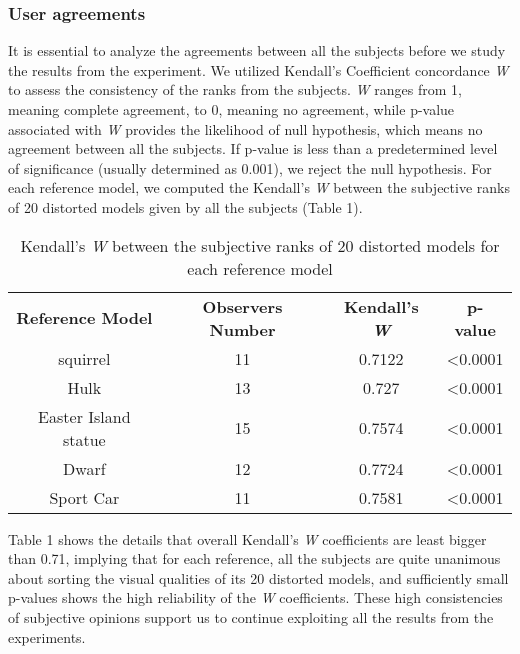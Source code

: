 \subsubsection{User agreements}
It is essential to analyze the agreements between all the subjects before we study the results from the experiment.  We utilized Kendall’s Coefficient concordance \textit{W} \cite{Kendall_1940} to assess the consistency of the ranks from the subjects.  \textit{W} ranges from 1, meaning complete agreement, to 0, meaning no agreement, while p-value associated with \textit{W} provides the likelihood of null hypothesis, which means no agreement between all the subjects. If p-value is less than a predetermined level of significance (usually determined as 0.001), we reject the null hypothesis. For each reference model, we computed the Kendall’s \textit{W} between the subjective ranks of 20 distorted models given by all the subjects (Table 1).\\
\begin{table} 
    \begin{tabular}{ c c c c }
        \textbf{Reference Model} & \textbf{Observers Number} & \textbf{Kendall's \textit{W}} & \textbf{p-value} \\ 
        squirrel & 11 & 0.7122 & <0.0001 \\ 
        Hulk & 13 & 0.727 & <0.0001 \\ 
        Easter Island statue & 15 & 0.7574 & <0.0001 \\ 
        Dwarf & 12 & 0.7724 & <0.0001 \\ 
        Sport Car & 11 & 0.7581 & <0.0001 \\ 
    \end{tabular} 
    \caption{Kendall’s \textit{W} between the subjective ranks of 20 distorted models for each reference model} 
\end{table}
Table 1 shows the details that overall Kendall’s \textit{W} coefficients are least bigger than 0.71, implying that for each reference, all the subjects are quite unanimous about sorting the visual qualities of its 20 distorted models, and sufficiently small p-values shows the high reliability of the \textit{W} coefficients. These high consistencies of subjective opinions support us to continue exploiting all the results from the experiments.\\
